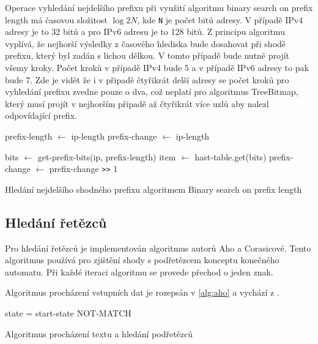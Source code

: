 Operace vyhledání nejdelšího prefixu při využití algoritmu binary search on prefix length má časovou
složitost $\log{2}{N}$, kde \texttt{N} je počet bitů adresy. V případě IPv4 adresy je to 32 bitů a pro IPv6
adresu je to 128 bitů. Z principu algoritmu vyplívá, že nejhorší výsledky z časového hlediska bude dosahovat
při shodě prefixu, který byl zadán s lichou délkou. V tomto případě bude nutné projít všemy kroky.
Počet kroků v případě IPv4 bude 5 a v případě IPv6 adresy to pak bude 7.
Zde je vidět že i v připadě čtyřikrát delší adresy se počet kroků pro vyhledání prefixu zvedne pouze o dva,
což neplatí pro algoritmus TreeBitmap, který musí projít v nejhorším případě až čtyřikrát více
uzlů aby nalezl odpovídající prefix.
\cite{bspl}

\begin{algorithm}
	prefix-length $\leftarrow$ ip-length\;
	prefix-change $\leftarrow$ ip-length\;
	{
		bits $\leftarrow$ get-prefix-bits(ip, prefix-length)\;
		item $\leftarrow$ hast-table.get(bits)\;
		prefix-change $\leftarrow$ prefix-change \texttt{>>} 1\;

	}
	\caption{Hledání nejdelšího shodného prefixu algoritmem Binary search on prefix length}
\end{algorithm}


\subsection{Hledání řetězců}

Pro hledání řetězců je implementován algoritmus autorů Aho a Corasicové. Tento algoritmus používá pro zjištění shody s podřetězcem konceptu konečného automatu. Při každé iteraci algoritmu se provede přechod o jeden znak.

Algoritmus procházení vstupních dat je rozepsán v \ref{alg:aho} a vychází z \cite{aho}.

\begin{algorithm}
	state = start-state\;
	{
	}
	\Return NOT-MATCH\;
	\caption{Algoritmus procházení textu a hledání podřetězců}
\end{algorithm}\label{alg:aho}

